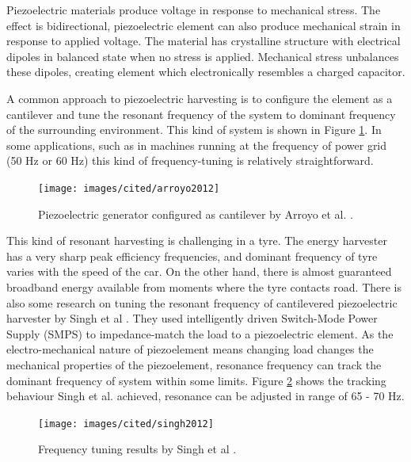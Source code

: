 Piezoelectric materials produce voltage in response to mechanical stress. The effect is bidirectional, piezoelectric element can also produce mechanical strain in response to applied voltage. The material has crystalline structure with electrical dipoles in balanced state when no stress is applied. Mechanical stress unbalances these dipoles, creating element which electronically resembles a charged capacitor. 

A common approach to piezoelectric harvesting is to configure the element as a cantilever and tune the resonant frequency of the system to dominant frequency of the surrounding environment. This kind of system is shown in Figure \ref{fiq:resonant_piezo}. In some applications, such as in machines running at the frequency of power grid (50 Hz or 60 Hz) this kind of frequency-tuning is relatively straightforward.

\begin{figure}[htb]
  \begin{center}
  \texttt{[image: images/cited/arroyo2012]}
  \end{center}
  \caption{Piezoelectric generator configured as cantilever by Arroyo et al. \cite{Arroyo2012}.}
  \label{fiq:resonant_piezo}
\end{figure}

This kind of resonant harvesting is challenging in a tyre. The energy harvester has a very sharp peak efficiency frequencies, and dominant frequency of tyre varies with the speed of the car. On the other hand, there is almost guaranteed broadband energy available from moments where the tyre contacts road. There is also some research on tuning the resonant frequency of cantilevered piezoelectric harvester by Singh et al \cite{Singh2012}. They used intelligently driven Switch-Mode Power Supply (SMPS) to impedance-match the load to a piezoelectric element. As the electro-mechanical nature of piezoelement means changing load changes the mechanical properties of the piezoelement, resonance frequency can track the dominant frequency of system within some limits. Figure \ref{fiq:tracking_piezo} shows the tracking behaviour Singh et al. achieved, resonance can be adjusted in range of 65 - 70 Hz.

\begin{figure}[htb]
  \begin{center}
  \texttt{[image: images/cited/singh2012]}
  \end{center}
  \caption{Frequency tuning results by Singh et al \cite{Singh2012}.}
  \label{fiq:tracking_piezo}
\end{figure}

